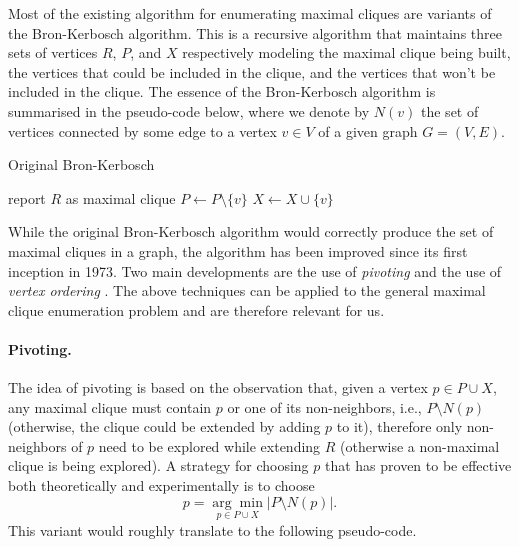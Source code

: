 \documentclass{article}
\begin{document}
\noindent
Most of the existing algorithm for enumerating maximal cliques are variants of
the Bron-Kerbosch \cite{Bron73} algorithm. This is a recursive algorithm that
maintains three sets of vertices $R$, $P$, and $X$ respectively modeling the
maximal clique being built, the vertices that could be included in the clique,
and the vertices that won't be included in the clique. The essence of the
Bron-Kerbosch algorithm is summarised in the pseudo-code below, where we denote
by $N(v)$ the set of vertices connected by some edge to a vertex $v \in V$ of a
given graph $G = (V,E)$.

\begin{algorithm}
\caption{Original Bron-Kerbosch}
\begin{algorithmic}
  \State report $R$ as maximal clique
\EndIf
{}
  \State {}
  \State $P \gets P \setminus \{v\}$
  \State $X \gets X \cup \{v\}$
\EndFor
\EndProcedure
\end{algorithmic}
\end{algorithm}

While the original Bron-Kerbosch algorithm would correctly produce the set of
maximal cliques in a graph, the algorithm has been improved since its first
inception in 1973. Two main developments are the use of \emph{pivoting}
\cite{Koch01, Cazals05} and the use of \emph{vertex ordering}
\cite{Eppstein11}. The above techniques can be applied to the general maximal
clique enumeration problem and are therefore relevant for us. 

\paragraph{Pivoting.}
%
The idea of pivoting is based on the observation that, given a vertex $p \in P
\cup X$, any maximal clique must contain $p$ or one of its non-neighbors,
i.e., $P \setminus N(p)$ (otherwise, the clique could be extended by adding $p$
to it), therefore only non-neighbors of $p$ need to be explored while
extending $R$ (otherwise a non-maximal clique is being explored). A strategy
for choosing $p$ that has proven to be effective both theoretically and
experimentally is to choose
%
\begin{equation}
  p = \underset{p \in P \cup X}{\arg\min} |P \setminus N(p)|.
\end{equation}
%
This variant would roughly translate to the following pseudo-code.
\end{document}
